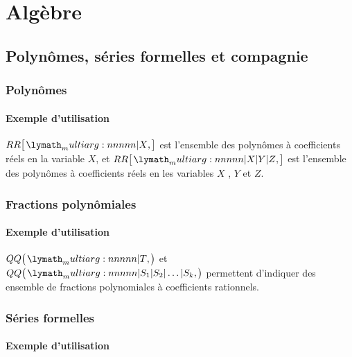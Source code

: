\documentclass[12pt,a4paper]{article}
\newcommand\QQ{QQ}
\newcommand\RR{RR}
\begin{document}
\section{Algèbre}

	\subsection{Polynômes, séries formelles et compagnie}

        \subsubsection{Polynômes}

            \paragraph{Exemple d'utilisation}

\begin{tcblisting}{}
$\polyset{\RR}{X}$ est l'ensemble des polynômes à coefficients réels en la variable
$X$, et $\polyset{\RR}{X | Y | Z}$ est l'ensemble des polynômes à coefficients réels
en les variables $X$ , $Y$ et $Z$.
\end{tcblisting}



        \subsubsection{Fractions polynômiales}

            \paragraph{Exemple d'utilisation}

\begin{tcblisting}{}
$\polyfracset{\QQ}{T}$ et $\polyfracset{\QQ}{S_1 | S_2 | \dots | S_k}$ permettent 
d'indiquer des ensemble de fractions polynomiales à coefficients rationnels.
\end{tcblisting}



        \subsubsection{Séries formelles}

            \paragraph{Exemple d'utilisation}
\end{document}
